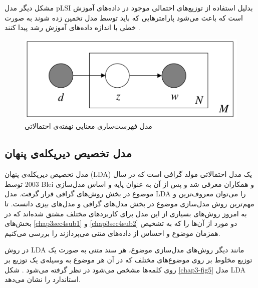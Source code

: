 	مشکل دیگر مدل
	pLSI
	بدلیل استفاده از توزیع‌های احتمالی‌ موجود در داده‌های آموزش است که باعث می‌‌شود پارامترهایی که باید توسط مدل تخمین زده شوند به صورت خطی با اندازه داده‌های آموزش رشد پیدا کنند
	\cite{blei2003latent}.
	\begin{figure}
		\centering
		\includegraphics[scale=0.4]{chap3-img/pLSI}
		\caption{مدل فهرست‌ساری معنایی نهفته‌ی احتمالاتی \cite{blei2003latent}}
		\label{chap3-fig4}
	\end{figure}
	
	
	\subsection{مدل تخصیص دیریکله‌ی پنهان}
	\label{chap3sec3sub4}
	مدل تخصیص دیریکله‌ی پنهان 
	(LDA)
	یک مدل احتمالاتی مولد گرافی است که در سال 2003 توسط 
	Blei 
	و همکاران
	\cite{blei2003latent}
	معرفی شد و پس از آن به عنوان پایه و اساس مدل‌سازی موضوع در بخش روش‌های گرافی‌ قرار گرفت. مدل
	LDA
	 را می‌‌توان معروف‌ترین و مهم‌ترین روش مدل‌سازی موضوع در بخش مدل‌های گرافی‌ و مدل‌های بیزی دانست. تا به امروز روش‌های بسیاری از این مدل برای کاربرد‌های مختلف مشتق شده‌اند که در بخش‌های
	 \ref{chap3sec4sub1}
	 و
	 \ref{chap3sec4sub2}
	 دو مورد از آن‌ها را که به تشخیص همزمان موضوع و احساس از داده‌های متنی می‌‌پردازند را بررسی‌ می‌‌کنیم.
	 
	 
	 
	 در روش  
	LDA
	مانند دیگر روش‌های مدل‌سازی موضوع، هر سند متنی به صورت یک توزیع مخلوط بر روی موضوع‌های مختلف‌ که در آن هر موضوع به وسیله‌ی یک توزیع بر روی کلمه‌ها مشخص می‌‌شود در نظر گرفته می‌شود
	\cite{blei2003latent}.
	شکل
	\ref{chap3-fig5}
	مدل
	LDA
	استاندارد را نشان می‌‌دهد.	
	
